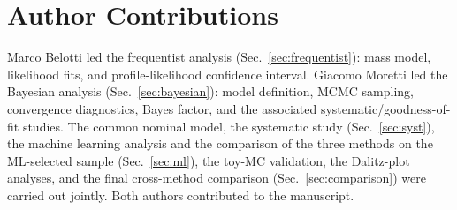 \section{Author Contributions}
\label{sec:contributions}
Marco Belotti led the frequentist analysis (Sec.~\ref{sec:frequentist}): mass model, likelihood fits, and profile-likelihood confidence interval. Giacomo Moretti led the Bayesian analysis (Sec.~\ref{sec:bayesian}): model definition, MCMC sampling, convergence diagnostics, Bayes factor, and the associated systematic/goodness-of-fit studies. The common nominal model, the systematic study (Sec.~\ref{sec:syst}), the machine learning analysis and the comparison of the three methods on the ML-selected sample (Sec.~\ref{sec:ml}), the toy-MC validation, the Dalitz-plot analyses, and the final cross-method comparison (Sec.~\ref{sec:comparison}) were carried out jointly. Both authors contributed to the manuscript.
